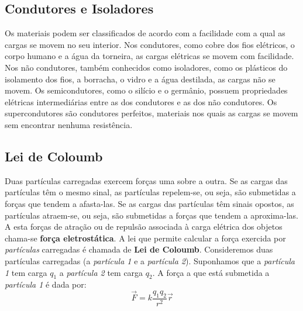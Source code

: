 \documentclass{article}
\begin{document}
\subsection{Condutores e Isoladores}
Os materiais podem ser classificados de acordo com a facilidade com a qual as cargas se movem no seu interior. Nos condutores, como cobre dos fios elétricos, o corpo humano e a água da torneira, as cargas elétricas se movem com facilidade. Nos não condutores, também conhecidos como isoladores, como os plásticos do isolamento dos fios, a borracha, o vidro e a água destilada, as cargas não se movem. Os semicondutores, como o silício e o germânio, possuem propriedades elétricas intermediárias entre as dos condutores e as dos não condutores. Os supercondutores são condutores perfeitos, materiais nos quais as cargas se movem sem encontrar nenhuma resistência.
\subsection{Lei de Coloumb}
Duas partículas carregadas exercem forças uma sobre a outra. Se as cargas das partículas têm o mesmo sinal, as partículas repelem-se, ou seja, são submetidas a forças que tendem a afasta-las. Se as cargas das partículas têm sinais opostos, as partículas atraem-se, ou seja, são submetidas a forças que tendem a aproxima-las.
A esta forças de atração ou de repulsão associada à carga elétrica dos objetos chama-se \textbf{força eletrostática}. A lei que permite calcular a força exercida por \textit{partículas} carregadas é chamada de \textbf{Lei de Coloumb}.
Consideremos duas partículas carregadas (a {\textit{partícula 1}} e a {\textit{partícula 2}}). Suponhamos que a \textit{partícula 1} tem carga \textit{$q_1$} a \textit{partícula 2} tem carga \textit{$q_2$}.
\newline
A força a que está submetida a \textit{partícula 1} é dada por:
\newline
\[ \vec{F} = k \frac{q_1 q_2}{r^2} \vec{r}\]
\end{document}
